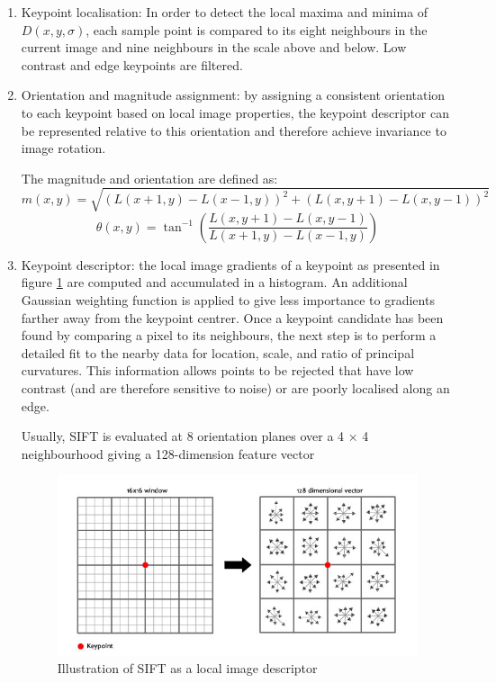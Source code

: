 \begin{enumerate}
    \item Keypoint localisation: In order to detect the local maxima and minima of $D(x, y,\sigma)$, each sample point is compared to its eight neighbours in the current image and nine neighbours in the scale above and below. Low contrast and edge keypoints are filtered.
    
    \item Orientation and magnitude assignment: by assigning a consistent orientation to each keypoint based on local image properties, the keypoint descriptor can be represented relative to this orientation and therefore achieve invariance to image rotation.
    
    The magnitude and orientation are defined as:
    $$
    m(x, y) = \sqrt{ \left( L(x +1, y) - L(x -1, y)  \right)^2 + \left( L(x, y + 1) - L(x, y - 1) \right)^2}
    $$
    $$
    \theta(x, y) =\tan^{-1} ( \frac{L(x, y + 1) - L(x, y - 1 )}{L(x + 1, y) - L(x - 1, y)} )
    $$
    
    \item Keypoint descriptor: the local image gradients of a keypoint as presented in figure \ref{fig:sift_descriptor} are computed and accumulated in a histogram. An additional Gaussian weighting function is applied to give less importance to gradients farther away from the keypoint centrer. Once a keypoint candidate has been found by comparing a pixel to its neighbours, the next step is to perform a detailed fit to the nearby data for location, scale, and ratio of principal curvatures. This information allows points to be rejected that have low contrast (and are therefore sensitive to noise) or are poorly localised along an edge.
    
    Usually, SIFT is evaluated at 8 orientation planes over a 4 × 4 neighbourhood giving a
    128-dimension feature vector
    
    \begin{figure}[h]
        \centering
        \includegraphics[scale=0.5]{img/sift_descriptor.jpg}
        \caption{Illustration of SIFT as a local image descriptor}
        \label{fig:sift_descriptor}
    \end{figure}
\end{enumerate}


